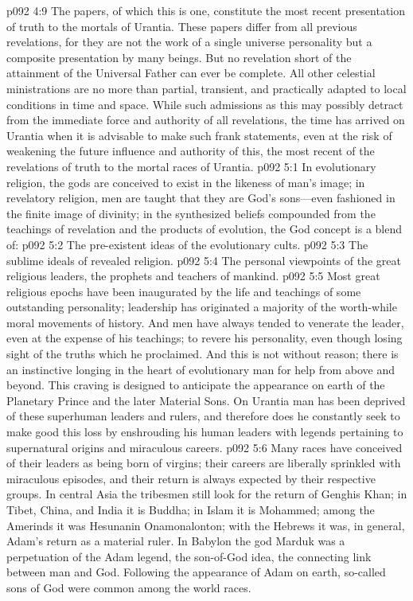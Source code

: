 \pc \vs p092 4:9 \bibnobreakspace {} The papers, of which this is one, constitute the most recent presentation of truth to the mortals of Urantia. These papers differ from all previous revelations, for they are not the work of a single universe personality but a composite presentation by many beings. But no revelation short of the attainment of the Universal Father can ever be complete. All other celestial ministrations are no more than partial, transient, and practically adapted to local conditions in time and space. While such admissions as this may possibly detract from the immediate force and authority of all revelations, the time has arrived on Urantia when it is advisable to make such frank statements, even at the risk of weakening the future influence and authority of this, the most recent of the revelations of truth to the mortal races of Urantia.\plusone
{}
\vs p092 5:1 In evolutionary religion, the gods are conceived to exist in the likeness of man’s image; in revelatory religion, men are taught that they are God’s sons---even fashioned in the finite image of divinity; in the synthesized beliefs compounded from the teachings of revelation and the products of evolution, the God concept is a blend of:
\pc \vs p092 5:2 \bibnobreakspace The pre\hyp{}existent ideas of the evolutionary cults.\plusone
\vs p092 5:3 \bibnobreakspace The sublime ideals of revealed religion.
\vs p092 5:4 \bibnobreakspace The personal viewpoints of the great religious leaders, the prophets and teachers of mankind.\plusone
\pc \vs p092 5:5 Most great religious epochs have been inaugurated by the life and teachings of some outstanding personality; leadership has originated a majority of the worth\hyp{}while moral movements of history. And men have always tended to venerate the leader, even at the expense of his teachings; to revere his personality, even though losing sight of the truths which he proclaimed. And this is not without reason; there is an instinctive longing in the heart of evolutionary man for help from above and beyond. This craving is designed to anticipate the appearance on earth of the Planetary Prince and the later Material Sons. On Urantia man has been deprived of these superhuman leaders and rulers, and therefore does he constantly seek to make good this loss by enshrouding his human leaders with legends pertaining to supernatural origins and miraculous careers.\plusone
\vs p092 5:6 Many races have conceived of their leaders as being born of virgins; their careers are liberally sprinkled with miraculous episodes, and their return is always expected by their respective groups. In central Asia the tribesmen still look for the return of Genghis Khan; in Tibet, China, and India it is Buddha; in Islam it is Mohammed; among the Amerinds it was Hesunanin Onamonalonton; with the Hebrews it was, in general, Adam’s return as a material ruler. In Babylon the god Marduk was a perpetuation of the Adam legend, the son\hyp{}of\hyp{}God idea, the connecting link between man and God. Following the appearance of Adam on earth, so\hyp{}called sons of God were common among the world races.
